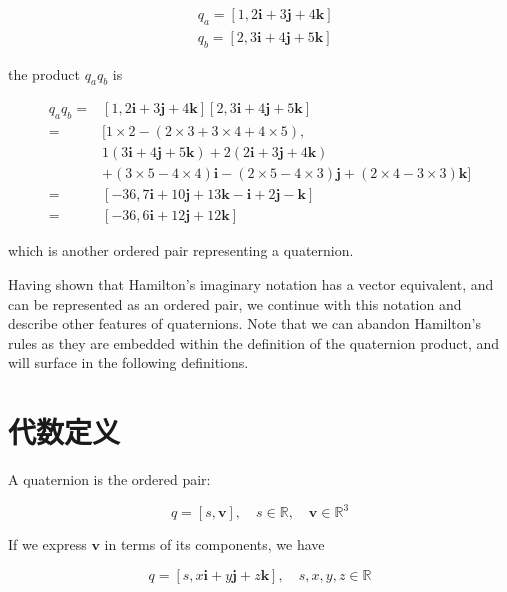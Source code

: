$$
    \begin{aligned}
         & q_{a}=[1,2 \mathbf{i}+3 \mathbf{j}+4 \mathbf{k}] \\
         & q_{b}=[2,3 \mathbf{i}+4 \mathbf{j}+5 \mathbf{k}]
    \end{aligned}
$$

the product $q_{a} q_{b}$ is

$$
    \begin{aligned}
        q_{a} q_{b}= & {[1,2 \mathbf{i}+3 \mathbf{j}+4 \mathbf{k}][2,3 \mathbf{i}+4 \mathbf{j}+5 \mathbf{k}] }                    \\
        =            & {[1 \times 2-(2 \times 3+3 \times 4+4 \times 5),}                                                          \\
                     & 1(3 \mathbf{i}+4 \mathbf{j}+5 \mathbf{k})+2(2 \mathbf{i}+3 \mathbf{j}+4 \mathbf{k})                        \\
                     & +(3 \times 5-4 \times 4) \mathbf{i}-(2 \times 5-4 \times 3) \mathbf{j}+(2 \times 4-3 \times 3) \mathbf{k}] \\
        =            & {[-36,7 \mathbf{i}+10 \mathbf{j}+13 \mathbf{k}-\mathbf{i}+2 \mathbf{j}-\mathbf{k}] }                       \\
        =            & {[-36,6 \mathbf{i}+12 \mathbf{j}+12 \mathbf{k}] }
    \end{aligned}
$$

which is another ordered pair representing a quaternion.

Having shown that Hamilton's imaginary notation has a vector equivalent, and can be represented as an ordered pair, we continue with this notation and describe other features of quaternions. Note that we can abandon Hamilton's rules as they are embedded within the definition of the quaternion product, and will surface in the following definitions.

\section{代数定义}
A quaternion is the ordered pair:

$$
    q=[s, \mathbf{v}], \quad s \in \mathbb{R}, \quad \mathbf{v} \in \mathbb{R}^{3}
$$

If we express $\mathbf{v}$ in terms of its components, we have

$$
    q=[s, x \mathbf{i}+y \mathbf{j}+z \mathbf{k}], \quad s, x, y, z \in \mathbb{R}
$$

